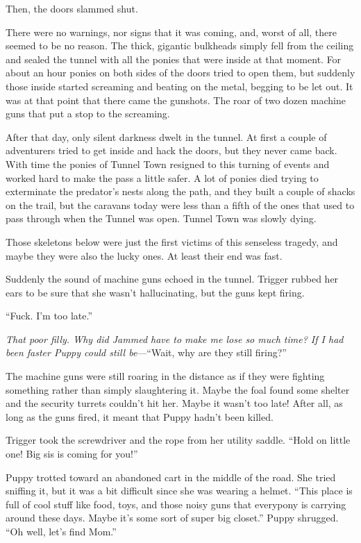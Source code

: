 Then, the doors slammed shut.

There were no warnings, nor signs that it was coming, and, worst of all, there seemed to be no reason. The thick, gigantic bulkheads simply fell from the ceiling and sealed the tunnel with all the ponies that were inside at that moment. For about an hour ponies on both sides of the doors tried to open them, but suddenly those inside started screaming and beating on the metal, begging to be let out. It was at that point that there came the gunshots. The roar of two dozen machine guns that put a stop to the screaming.

After that day, only silent darkness dwelt in the tunnel. At first a couple of adventurers tried to get inside and hack the doors, but they never came back. With time the ponies of Tunnel Town resigned to this turning of events and worked hard to make the pass a little safer. A lot of ponies died trying to exterminate the predator's nests along the path, and they built a couple of shacks on the trail, but the caravans today were less than a fifth of the ones that used to pass through when the Tunnel was open. Tunnel Town was slowly dying.

Those skeletons below were just the first victims of this senseless tragedy, and maybe they were also the lucky ones. At least their end was fast.

Suddenly the sound of machine guns echoed in the tunnel. Trigger rubbed her ears to be sure that she wasn't hallucinating, but the guns kept firing.

``Fuck. I'm too late.''

\emph{That poor filly. Why did Jammed have to make me lose so much time? If I had been faster Puppy could still be}---``Wait, why are they still firing?''

The machine guns were still roaring in the distance as if they were fighting something rather than simply slaughtering it. Maybe the foal found some shelter and the security turrets couldn't hit her. Maybe it wasn't too late! After all, as long as the guns fired, it meant that Puppy hadn't been killed.

Trigger took the screwdriver and the rope from her utility saddle. ``Hold on little one! Big sis is coming for you!''


\horizonline


Puppy trotted toward an abandoned cart in the middle of the road. She tried sniffing it, but it was a bit difficult since she was wearing a helmet. ``This place is full of cool stuff like food, toys, and those noisy guns that everypony is carrying around these days. Maybe it's some sort of super big closet.'' Puppy shrugged. ``Oh well, let's find Mom.''

